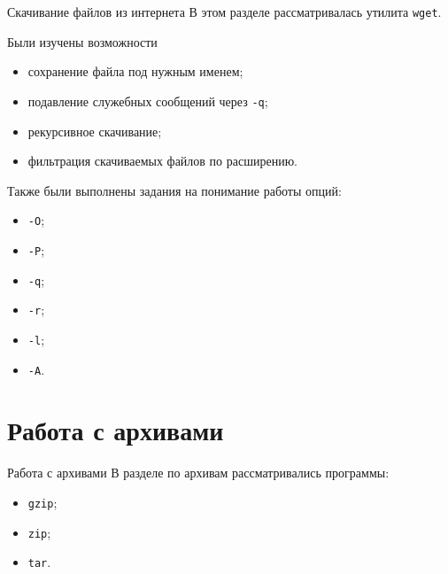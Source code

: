 \documentclass[
  11pt,
  ignorenonframetext,
  aspectratio=169,
  russian,
]{beamer}
\providecommand{\tightlist}{%
  \setlength{\itemsep}{0pt}\setlength{\parskip}{0pt}}
\begin{document}
\begin{frame}[fragile]{Скачивание файлов из интернета}
В этом разделе рассматривалась утилита \texttt{wget}.
\end{frame}

\begin{frame}[fragile]{Были изучены возможности}
\protect{}\label{ux431ux44bux43bux438-ux438ux437ux443ux447ux435ux43dux44b-ux432ux43eux437ux43cux43eux436ux43dux43eux441ux442ux438}
\begin{itemize}[<+->]
\tightlist
\item
  сохранение файла под нужным именем;
\item
  подавление служебных сообщений через \texttt{-q};
\item
  рекурсивное скачивание;
\item
  фильтрация скачиваемых файлов по расширению.
\end{itemize}

Также были выполнены задания на понимание работы опций:

\begin{itemize}[<+->]
\tightlist
\item
  \texttt{-O};
\item
  \texttt{-P};
\item
  \texttt{-q};
\item
  \texttt{-r};
\item
  \texttt{-l};
\item
  \texttt{-A}.
\end{itemize}
\end{frame}

\section{Работа с
архивами}\label{ux440ux430ux431ux43eux442ux430-ux441-ux430ux440ux445ux438ux432ux430ux43cux438}

\begin{frame}[fragile]{Работа с архивами}
В разделе по архивам рассматривались программы:

\begin{itemize}[<+->]
\tightlist
\item
  \texttt{gzip};
\item
  \texttt{zip};
\item
  \texttt{tar}.
\end{itemize}
\end{frame}
\end{document}
